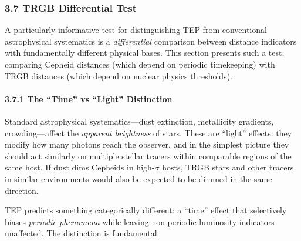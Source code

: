 \documentclass[
]{article}
\begin{document}
\subsubsection{3.7 TRGB Differential Test}\label{trgb-differential-test}

A particularly informative test for distinguishing TEP from conventional
astrophysical systematics is a \emph{differential} comparison between
distance indicators with fundamentally different physical bases. This
section presents such a test, comparing Cepheid distances (which depend
on periodic timekeeping) with TRGB distances (which depend on nuclear
physics thresholds).

\paragraph{3.7.1 The ``Time'' vs ``Light''
Distinction}\label{the-time-vs-light-distinction}

Standard astrophysical systematics---dust extinction, metallicity
gradients, crowding---affect the \emph{apparent brightness} of stars.
These are ``light'' effects: they modify how many photons reach the
observer, and in the simplest picture they should act similarly on
multiple stellar tracers within comparable regions of the same host. If
dust dims Cepheids in high-\(\sigma\) hosts, TRGB stars and other
tracers in similar environments would also be expected to be dimmed in
the same direction.

TEP predicts something categorically different: a ``time'' effect that
selectively biases \emph{periodic phenomena} while leaving non-periodic
luminosity indicators unaffected. The distinction is fundamental:
\end{document}
